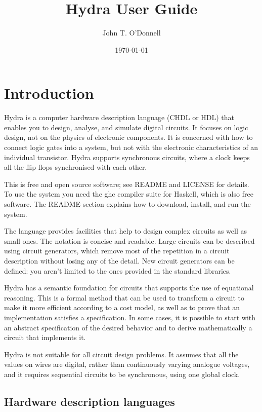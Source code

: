 \documentclass[11pt]{article}
\author{John T. O'Donnell}
\date{\today}
\title{Hydra User Guide}
\begin{document}
\maketitle
\setcounter{tocdepth}{3}
\tableofcontents

\newcommand{\color}[1]{{}}
\newcommand{\alert}[1]{{}}

\section{Introduction}
\label{sec:orgdb6ad38}

Hydra is a computer hardware description language (CHDL or HDL) that
enables you to design, analyse, and simulate digital circuits.  It
focuses on logic design, not on the physics of electronic components.
It is concerned with how to connect logic gates into a system, but not
with the electronic characteristics of an individual transistor.
Hydra supports synchronous circuits, where a clock keeps all the flip
flops synchronised with each other.

This is free and open source software; see README and LICENSE for
details.  To use the system you need the ghc compiler suite for
Haskell, which is also free software.  The README section explains how
to download, install, and run the system.

The language provides facilities that help to design complex circuits
as well as small ones. The notation is concise and readable.  Large
circuits can be described using circuit generators, which remove most
of the repetition in a circuit description without losing any of the
detail.  New circuit generators can be defined: you aren't limited to
the ones provided in the standard libraries.

Hydra has a semantic foundation for circuits that supports the use of
equational reasoning.  This is a formal method that can be used to
transform a circuit to make it more efficient according to a cost
model, as well as to prove that an implementation satisfies a
specification.  In some cases, it is possible to start with an
abstract specification of the desired behavior and to derive
mathematically a circuit that implements it.

Hydra is not suitable for all circuit design problems.  It assumes
that all the values on wires are digital, rather than continuously
varying analogue voltages, and it requires sequential circuits to be
synchronous, using one global clock.

\subsection{Hardware description languages}
\label{sec:orgdaf4f34}
\end{document}
